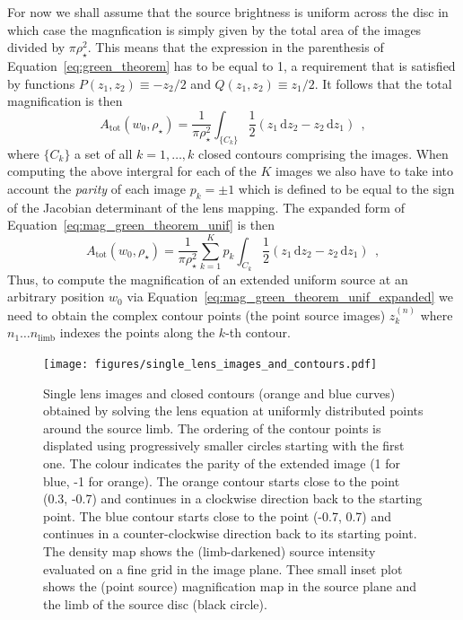 \documentclass[12pt,dvipsnames]{report}
\newcommand{\ud}{\,\mathrm{d}}
\newcommand{\hquad}{~~}
\begin{document}
For now we shall assume that the source brightness is uniform across the disc in which 
case the magnfication is simply given by the total area of the images
divided by $\pi\rho_\star^2$. This means that the expression in the parenthesis
of Equation~\ref{eq:green_theorem} has to be equal to 1, a requirement that is 
satisfied by functions $P(z_1, z_2)\equiv -z_2/2$ and $Q(z_1, z_2)\equiv
    z_1/2$. It follows that the total magnification is then
\begin{equation}
    A_\mathrm{tot}\left(w_0, \rho_{\star}\right)=\frac{1}{\pi \rho_{\star}^{2}}
    \int_{\{C_k\}} \frac{1}{2}(z_{1} \ud z_{2}-z_{2} \ud z_{1})\hquad ,
    \label{eq:mag_green_theorem_unif}
\end{equation}
where $\{C_k\}$ a set of all $k=1,\dots,k$ closed contours comprising the images.
When computing the  above intergral for each of the $K$ images  we also have to
take into account the \textsl{parity} of each image $p_k=\pm 1$ which is defined to
be equal to the sign of the Jacobian determinant of the lens mapping. The expanded
form of Equation~\ref{eq:mag_green_theorem_unif} is then
\begin{equation}
    A_\mathrm{tot}\left(w_0, \rho_{\star}\right)=\frac{1}{\pi \rho_{\star}^{2}}
    \sum_{k=1}^Kp_k\int_{C_k} \frac{1}{2}(z_{1} \ud z_{2}-z_{2} \ud z_{1})\hquad ,
    \label{eq:mag_green_theorem_unif_expanded}
\end{equation}
Thus, to compute the magnification of an extended uniform source at an arbitrary 
position $w_0$ via Equation~\ref{eq:mag_green_theorem_unif_expanded} we need
to obtain the complex contour points (the point source images) $z_k^{(n)}$ where $n_1\dots
    n_\mathrm{limb}$ indexes the points along the $k$-th contour. 

\begin{figure}[t]
    \begin{centering}
        \texttt{[image: figures/single\_lens\_images\_and\_contours.pdf]}
        \caption{
            Single lens images and closed contours (orange and blue curves) obtained by 
            solving the lens equation at uniformly distributed points around the source limb.
            The ordering of the contour points is displated using progressively smaller 
            circles starting with the first one. The colour indicates
            the parity of the extended image (1 for blue, -1 for orange).
            The orange contour starts close to the point (0.3, -0.7) and continues in 
            a clockwise direction back to the starting point. The blue contour starts 
            close to the point (-0.7, 0.7) and continues in a counter-clockwise direction 
            back to its starting point. The density map shows the (limb-darkened) source
            intensity evaluated on a fine grid in the image plane. Thee small
            inset plot shows the (point source) magnification map in the source plane
            and the limb of the source disc (black circle).
        }
        \label{fig:single_lens_images_and_contours}
    \end{centering}
\end{figure}
\end{document}
